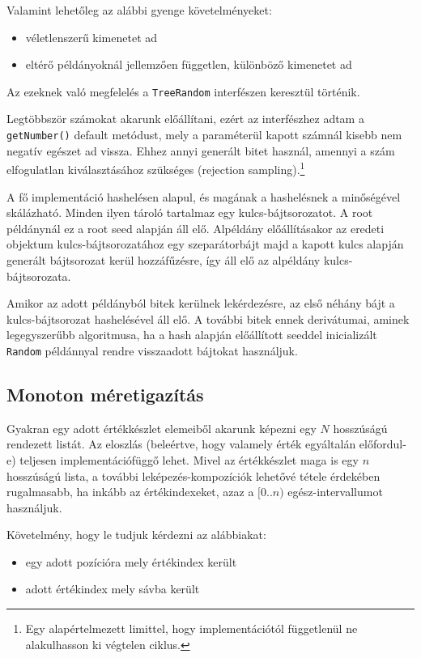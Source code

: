 \documentclass[
    parspace,
    noindent,
    nohyp,
]{elteiktdk}[2023/04/10]
\begin{document}
Valamint lehetőleg az alábbi gyenge követelményeket:

\begin{itemize}
   \item véletlenszerű kimenetet ad
   \item eltérő példányoknál jellemzően független, különböző kimenetet ad
\end{itemize}

Az ezeknek való megfelelés a \texttt{TreeRandom} interfészen keresztül történik.

Legtöbbször számokat akarunk előállítani,
ezért az interfészhez adtam a \texttt{getNumber()} default metódust,
mely a paraméterül kapott számnál kisebb nem negatív egészet ad vissza.
Ehhez annyi generált bitet használ,
amennyi a szám elfogulatlan kiválasztásához szükséges (rejection sampling).\footnote{
  Egy alapértelmezett limittel, hogy implementációtól függetlenül ne alakulhasson ki végtelen ciklus.
}

A fő implementáció hashelésen alapul, és magának a hashelésnek a minőségével skálázható.
Minden ilyen tároló tartalmaz egy kulcs-bájtsorozatot.
A root példánynál ez a root seed alapján áll elő.
Alpéldány előállításakor az eredeti objektum kulcs-bájtsorozatához egy szeparátorbájt
majd a kapott kulcs alapján generált bájtsorozat kerül hozzáfűzésre,
így áll elő az alpéldány kulcs-bájtsorozata.

Amikor az adott példányból bitek kerülnek lekérdezésre,
az első néhány bájt a kulcs-bájtsorozat hashelésével áll elő.
A további bitek ennek derivátumai, aminek legegyszerűbb algoritmusa,
ha a hash alapján előállított seeddel inicializált \texttt{Random} példánnyal
rendre visszaadott bájtokat használjuk.

\subsection{Monoton méretigazítás}

Gyakran egy adott értékkészlet elemeiből akarunk képezni egy $N$ hosszúságú rendezett listát.
Az eloszlás (beleértve, hogy valamely érték egyáltalán előfordul-e)
teljesen implementációfüggő lehet.
Mivel az értékkészlet maga is egy $n$ hosszúságú lista,
a további leképezés-kompozíciók lehetővé tétele érdekében rugalmasabb,
ha inkább az értékindexeket, azaz a $[0..n)$ egész-intervallumot használjuk.

Követelmény, hogy le tudjuk kérdezni az alábbiakat:

\begin{itemize}
    \item egy adott pozícióra mely értékindex került
    \item adott értékindex mely sávba került
\end{itemize}
\end{document}
